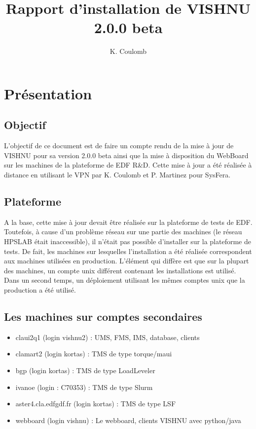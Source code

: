 \documentclass{article}
\title{Rapport d'installation de VISHNU 2.0.0 beta}
\author{K. Coulomb}
\begin{document}
\frontmatter %
\maketitle %
\tableofcontents %
\mainmatter %





\section{Pr\'esentation}
    
\subsection{Objectif}
L'objectif de ce document est de faire un compte rendu de la mise à
jour de VISHNU pour sa version 2.0.0 beta ainsi que la mise à disposition du WebBoard sur les machines
de la plateforme de EDF R\&D. Cette mise à jour a été 
réalisée à distance en utilisant le VPN par K. Coulomb et P. Martinez pour SysFera.

\subsection{Plateforme}
A la base, cette mise à jour devait \^etre r\'ealis\'ee sur la 
plateforme de tests de EDF. Toutefois, \`a cause d'un probl\`eme
r\'eseau sur une partie des machines (le r\'eseau HPSLAB \'etait
inaccessible), il n'\'etait pas possible d'installer sur la
plateforme de tests. De fait, les machines sur lesquelles l'installation
a \'et\'e r\'ealis\'ee correspondent aux machines utilis\'ees en production. L'\'el\'ement qui diff\`ere est que sur la plupart
des machines, un compte unix diff\'erent contenant les installations est utilis\'e. Dans un second temps, un déploiement
utilisant les m\^emes comptes unix que la production a \'et\'e 
utilis\'e.

\subsection{Les machines sur comptes secondaires}
\begin{itemize}
\item claui2q1 (login vishnu2) : UMS, FMS, IMS, database, clients
\item clamart2 (login kortas) : TMS de type torque/maui
\item bgp (login kortas) : TMS de type LoadLeveler
\item ivanoe (login : C70353) : TMS de type  Slurm
\item aster4.cla.edfgdf.fr (login kortas) : TMS de type  LSF
\item webboard (login vishnu) : Le webboard, clients VISHNU avec python/java
\end{itemize}
\end{document}
